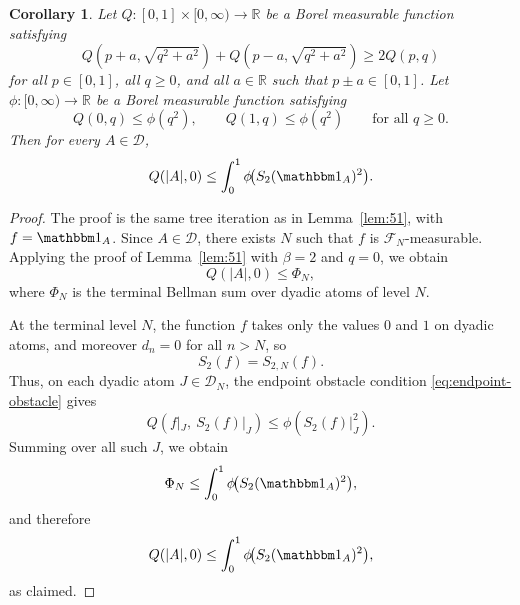 \documentclass[11pt]{amsart}
\newtheorem{corollary}[theorem]{Corollary}
\theoremstyle{definition}
\renewcommand{\1}{{\mathbbm{1}}}
\begin{document}
\begin{corollary}\label{cor:endpoint-lemma}
Let $Q:[0,1]\times[0,\infty)\to\mathbb R$ be a Borel measurable function satisfying 
\begin{equation}\label{eq:3pi-S2}
Q\!\left(p+a,\sqrt{q^{2}+a^{2}}\right)
+
Q\!\left(p-a,\sqrt{q^{2}+a^{2}}\right)
\ge 2Q(p,q)
\end{equation}
for all $p\in[0,1]$, all $q\ge0$, and all $a\in\mathbb R$ such that $p\pm a\in[0,1]$. Let $\phi:[0,\infty)\to\mathbb R$ be a Borel measurable function satisfying 
\begin{equation}\label{eq:endpoint-obstacle}
Q(0,q)\le \phi(q^2),\qquad Q(1,q)\le \phi(q^2)
\qquad\text{for all }q\ge0.
\end{equation}
Then for every $A\in\mathcal D$,
\[
Q(|A|,0)\le \int_0^1 \phi\!\big(S_2(\mathbbm 1_A)^2\big).
\]
\end{corollary}

\begin{proof}
The proof is the same tree iteration as in Lemma~\ref{lem:51}, with $f=\mathbbm 1_A$. 
Since $A\in\mathcal D$, there exists $N$ such that $f$ is $\mathcal F_N$-measurable. 
Applying the proof of Lemma~\ref{lem:51} with $\beta=2$ and $q=0$, we obtain
\[
Q(|A|,0)\le \Phi_N,
\]
where $\Phi_N$ is the terminal Bellman sum over dyadic atoms of level $N$.

At the terminal level $N$, the function $f$ takes only the values $0$ and $1$ on dyadic atoms, and moreover $d_n=0$ for all $n>N$, so
\[
S_2(f)=S_{2,N}(f).
\]
Thus, on each dyadic atom $J\in\mathcal D_N$, the endpoint obstacle condition \eqref{eq:endpoint-obstacle} gives
\[
Q\!\left(f|_J,\ S_2(f)|_J\right)\le \phi\!\left(S_2(f)|_J^2\right).
\]
Summing over all such $J$, we obtain
\[
\Phi_N\le \int_0^1 \phi\!\big(S_2(\mathbbm 1_A)^2\big),
\]
and therefore
\[
Q(|A|,0)\le \int_0^1 \phi\!\big(S_2(\mathbbm 1_A)^2\big),
\]
as claimed.
\end{proof}



\end{document}
